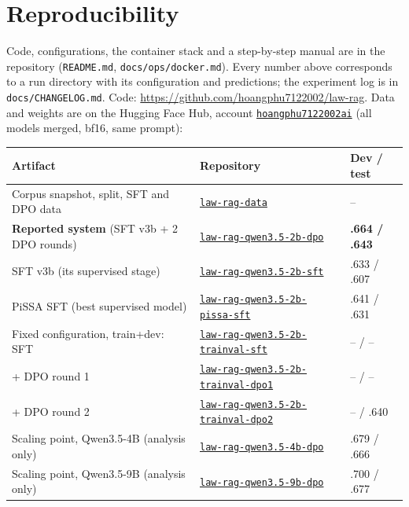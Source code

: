 \documentclass[11pt,a4paper]{article}
\begin{document}
\section*{Reproducibility}
Code, configurations, the container stack and a step-by-step manual are in the repository (\texttt{README.md}, \texttt{docs/ops/docker.md}). Every number above corresponds to a run directory with its configuration and predictions; the experiment log is in \texttt{docs/CHANGELOG.md}. Code: \url{https://github.com/hoangphu7122002/law-rag}. Data and weights are on the Hugging Face Hub, account \href{https://huggingface.co/hoangphu7122002ai}{\texttt{hoangphu7122002ai}} (all models merged, bf16, same prompt):

\begin{center}\small
\begin{tabular}{@{}lll@{}}
\toprule
Artifact & Repository & Dev / test\\
\midrule
Corpus snapshot, split, SFT and DPO data & \href{https://huggingface.co/datasets/hoangphu7122002ai/law-rag-data}{\texttt{law-rag-data}} & --\\
\textbf{Reported system} (SFT v3b + 2 DPO rounds) & \href{https://huggingface.co/hoangphu7122002ai/law-rag-qwen3.5-2b-dpo}{\texttt{law-rag-qwen3.5-2b-dpo}} & \textbf{.664 / .643}\\
SFT v3b (its supervised stage) & \href{https://huggingface.co/hoangphu7122002ai/law-rag-qwen3.5-2b-sft}{\texttt{law-rag-qwen3.5-2b-sft}} & .633 / .607\\
PiSSA SFT (best supervised model) & \href{https://huggingface.co/hoangphu7122002ai/law-rag-qwen3.5-2b-pissa-sft}{\texttt{law-rag-qwen3.5-2b-pissa-sft}} & .641 / .631\\
Fixed configuration, train+dev: SFT & \href{https://huggingface.co/hoangphu7122002ai/law-rag-qwen3.5-2b-trainval-sft}{\texttt{law-rag-qwen3.5-2b-trainval-sft}} & -- / --\\
\quad + DPO round 1 & \href{https://huggingface.co/hoangphu7122002ai/law-rag-qwen3.5-2b-trainval-dpo1}{\texttt{law-rag-qwen3.5-2b-trainval-dpo1}} & -- / --\\
\quad + DPO round 2 & \href{https://huggingface.co/hoangphu7122002ai/law-rag-qwen3.5-2b-trainval-dpo2}{\texttt{law-rag-qwen3.5-2b-trainval-dpo2}} & -- / .640\\
Scaling point, Qwen3.5-4B (analysis only) & \href{https://huggingface.co/hoangphu7122002ai/law-rag-qwen3.5-4b-dpo}{\texttt{law-rag-qwen3.5-4b-dpo}} & .679 / .666\\
Scaling point, Qwen3.5-9B (analysis only) & \href{https://huggingface.co/hoangphu7122002ai/law-rag-qwen3.5-9b-dpo}{\texttt{law-rag-qwen3.5-9b-dpo}} & .700 / .677\\
\bottomrule
\end{tabular}
\end{center}
\end{document}
